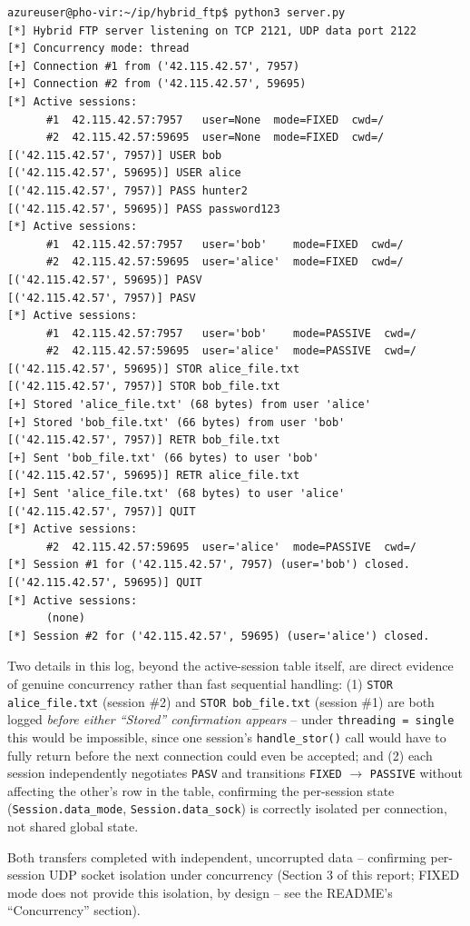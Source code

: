 \documentclass[11pt]{article}
\begin{document}
\begin{lstlisting}
azureuser@pho-vir:~/ip/hybrid_ftp$ python3 server.py
[*] Hybrid FTP server listening on TCP 2121, UDP data port 2122
[*] Concurrency mode: thread
[+] Connection #1 from ('42.115.42.57', 7957)
[+] Connection #2 from ('42.115.42.57', 59695)
[*] Active sessions:
      #1  42.115.42.57:7957   user=None  mode=FIXED  cwd=/
      #2  42.115.42.57:59695  user=None  mode=FIXED  cwd=/
[('42.115.42.57', 7957)] USER bob
[('42.115.42.57', 59695)] USER alice
[('42.115.42.57', 7957)] PASS hunter2
[('42.115.42.57', 59695)] PASS password123
[*] Active sessions:
      #1  42.115.42.57:7957   user='bob'    mode=FIXED  cwd=/
      #2  42.115.42.57:59695  user='alice'  mode=FIXED  cwd=/
[('42.115.42.57', 59695)] PASV
[('42.115.42.57', 7957)] PASV
[*] Active sessions:
      #1  42.115.42.57:7957   user='bob'    mode=PASSIVE  cwd=/
      #2  42.115.42.57:59695  user='alice'  mode=PASSIVE  cwd=/
[('42.115.42.57', 59695)] STOR alice_file.txt
[('42.115.42.57', 7957)] STOR bob_file.txt
[+] Stored 'alice_file.txt' (68 bytes) from user 'alice'
[+] Stored 'bob_file.txt' (66 bytes) from user 'bob'
[('42.115.42.57', 7957)] RETR bob_file.txt
[+] Sent 'bob_file.txt' (66 bytes) to user 'bob'
[('42.115.42.57', 59695)] RETR alice_file.txt
[+] Sent 'alice_file.txt' (68 bytes) to user 'alice'
[('42.115.42.57', 7957)] QUIT
[*] Active sessions:
      #2  42.115.42.57:59695  user='alice'  mode=PASSIVE  cwd=/
[*] Session #1 for ('42.115.42.57', 7957) (user='bob') closed.
[('42.115.42.57', 59695)] QUIT
[*] Active sessions:
      (none)
[*] Session #2 for ('42.115.42.57', 59695) (user='alice') closed.
\end{lstlisting}
Two details in this log, beyond the active-session table itself, are direct
evidence of genuine concurrency rather than fast sequential handling: (1)
\texttt{STOR alice\_file.txt} (session \#2) and \texttt{STOR bob\_file.txt}
(session \#1) are both logged \emph{before either ``Stored'' confirmation
appears} -- under \texttt{threading = single} this would be impossible, since
one session's \texttt{handle\_stor()} call would have to fully return before
the next connection could even be accepted; and (2) each session independently
negotiates \texttt{PASV} and transitions \texttt{FIXED} $\to$ \texttt{PASSIVE}
without affecting the other's row in the table, confirming the per-session
state (\texttt{Session.data\_mode}, \texttt{Session.data\_sock}) is correctly
isolated per connection, not shared global state.

Both transfers completed with independent, uncorrupted data -- confirming
per-session UDP socket isolation under concurrency (Section 3 of this report;
FIXED mode does not provide this isolation, by design -- see the README's
``Concurrency'' section).
\end{document}
